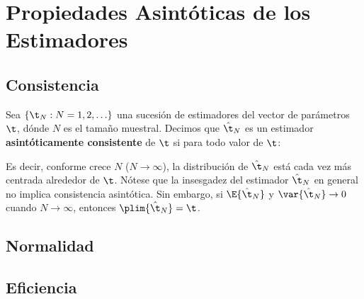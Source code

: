 \section{Propiedades Asintóticas de los Estimadores}

\subsection{Consistencia}

Sea $\lbrace \t_N:N=1,2,\hdots \rbrace$ una sucesión de estimadores del vector de parámetros $\t$, dónde $N$ es el tamaño muestral. Decimos que $\hat{\t}_N$ es un estimador \textbf{asintóticamente consistente} de $\t$ si para todo valor de $\t$:

\bigskip
Es decir, conforme crece $N$ ($N\to\infty$), la distribución de $\hat{\t}_N$ está cada vez más centrada alrededor de $\t$. Nótese que la insesgadez del estimador $\hat{\t}_N$ en general no implica consistencia asintótica. Sin embargo, si $\E{\hat{\t}_N}$ y $\var{\hat{\t}_N}\to 0$ cuando $N\to \infty$, entonces $\plim{\hat{\t}_N}=\t$.

\subsection{Normalidad}

\subsection{Eficiencia}
